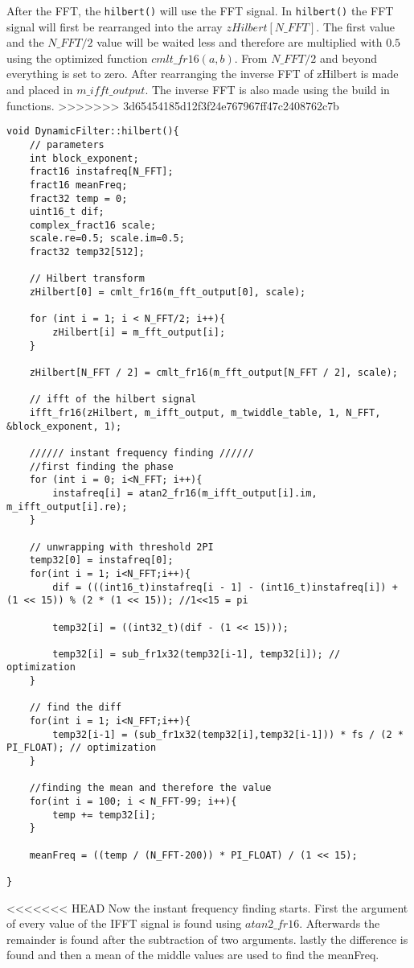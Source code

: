 After the FFT, the \texttt{hilbert()} will use the FFT signal. In \texttt{hilbert()} the FFT signal will first be rearranged into the array $zHilbert[N\_FFT]$.
The first value and the $N\_FFT/2$ value will be waited less and therefore are multiplied with $0.5$ using the optimized function $cmlt\_fr16(a,b)$.
From $N\_FFT/2$ and beyond everything is set to zero. 
After rearranging the inverse FFT of zHilbert is made and placed in $m\_ifft\_output$.
The inverse FFT is also made using the build in functions.
>>>>>>> 3d65454185d12f3f24e767967ff47c2408762c7b
\begin{verbatim}
void DynamicFilter::hilbert(){
	// parameters
	int block_exponent;
	fract16 instafreq[N_FFT];
	fract16 meanFreq;
	fract32 temp = 0;
	uint16_t dif;
	complex_fract16 scale;
	scale.re=0.5; scale.im=0.5;
	fract32 temp32[512];
			
	// Hilbert transform
	zHilbert[0] = cmlt_fr16(m_fft_output[0], scale);
	
	for (int i = 1; i < N_FFT/2; i++){
		zHilbert[i] = m_fft_output[i];
	}
		
	zHilbert[N_FFT / 2] = cmlt_fr16(m_fft_output[N_FFT / 2], scale);
	
	// ifft of the hilbert signal
	ifft_fr16(zHilbert, m_ifft_output, m_twiddle_table, 1, N_FFT, &block_exponent, 1);
		
	////// instant frequency finding //////
	//first finding the phase
	for (int i = 0; i<N_FFT; i++){
		instafreq[i] = atan2_fr16(m_ifft_output[i].im, m_ifft_output[i].re);
	}
	
	// unwrapping with threshold 2PI
	temp32[0] = instafreq[0];
	for(int i = 1; i<N_FFT;i++){
		dif = (((int16_t)instafreq[i - 1] - (int16_t)instafreq[i]) + (1 << 15)) % (2 * (1 << 15)); //1<<15 = pi
		
		temp32[i] = ((int32_t)(dif - (1 << 15)));
			
		temp32[i] = sub_fr1x32(temp32[i-1],	temp32[i]); // optimization
	}
		
	// find the diff
	for(int i = 1; i<N_FFT;i++){
		temp32[i-1] = (sub_fr1x32(temp32[i],temp32[i-1])) * fs / (2 * PI_FLOAT); // optimization
	}
		
	//finding the mean and therefore the value
	for(int i = 100; i < N_FFT-99; i++){
		temp += temp32[i];
	}
		
	meanFreq = ((temp / (N_FFT-200)) * PI_FLOAT) / (1 << 15);
		
}
\end{verbatim}
<<<<<<< HEAD
Now the instant frequency finding starts. First the argument of every value of the IFFT signal is found using $atan2\_fr16$. Afterwards the remainder is found after the subtraction of two arguments. lastly the difference is found and then a mean of the middle values are used to find the meanFreq.

